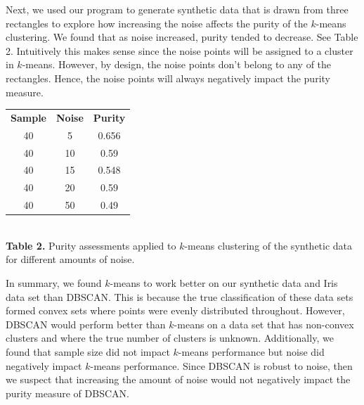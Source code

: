\documentclass[psamsfonts,onesided,10pt]{amsart}
\begin{document}
Next, we used our program to generate synthetic data that is drawn from three rectangles to 
explore how increasing the noise affects the purity of the $k$-means clustering. We found that 
as noise increased, purity tended to decrease. See Table 2. Intuitively this makes sense since the 
noise points will be assigned to a cluster in $k$-means. However, by design, the noise points 
don't belong to any of the rectangles. Hence, the noise points will always negatively impact the purity measure. 

\vspace{1ex}
\begin{center}
\begin{tabular}{ |c|c|c| } 
 \hline
\textbf{Sample} & \textbf{Noise} & \textbf{Purity}\\ 
40 & 5 & 0.656 \\ 
40 & 10 & 0.59 \\ 
40 & 15 & 0.548 \\ 
40 & 20 & 0.59 \\ 
40 & 50 & 0.49 \\ 
 \hline
\end{tabular}\\
\textbf{Table 2.} Purity assessments applied to $k$-means clustering of the synthetic data for 
different amounts of noise.
\end{center}
\vspace{1ex}

In summary, we found $k$-means to work better on our synthetic data and Iris data set than 
DBSCAN. This is because the true classification of these data sets formed convex sets where 
points were evenly distributed throughout. However, DBSCAN would perform better than 
$k$-means on a data set that has non-convex clusters and where the true number of clusters is 
unknown. Additionally, we found that sample size did not impact $k$-means performance but 
noise did negatively impact $k$-means performance. Since DBSCAN is robust to noise, then we 
suspect that increasing the amount of noise would not negatively impact the purity measure of DBSCAN.
\end{document}
